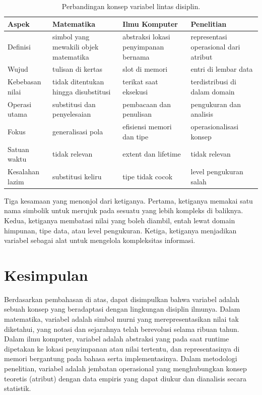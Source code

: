 \documentclass[11pt,a4paper]{article}
\begin{document}
\begin{table}[H]
	\centering
	\caption{Perbandingan konsep variabel lintas disiplin.}
	\label{tab:comparison}
	\footnotesize
	\begin{tabularx}{\textwidth}{l X X X}
		\toprule
		Aspek           & Matematika                            & Ilmu Komputer                        & Penelitian                            \\
		\midrule
		Definisi        & simbol yang mewakili objek matematika & abstraksi lokasi penyimpanan bernama & representasi operasional dari atribut \\
		Wujud           & tulisan di kertas                     & slot di memori                       & entri di lembar data                  \\
		Kebebasan nilai & tidak ditentukan hingga disubstitusi  & terikat saat eksekusi                & terdistribusi di dalam domain         \\
		Operasi utama   & substitusi dan penyelesaian           & pembacaan dan penulisan              & pengukuran dan analisis               \\
		Fokus           & generalisasi pola                     & efisiensi memori dan tipe            & operasionalisasi konsep               \\
		Satuan waktu    & tidak relevan                         & extent dan lifetime                  & tidak relevan                         \\
		Kesalahan lazim & substitusi keliru                     & tipe tidak cocok                     & level pengukuran salah                \\
		\bottomrule
	\end{tabularx}
\end{table}

Tiga kesamaan yang menonjol dari ketiganya. Pertama, ketiganya memakai satu nama simbolik untuk merujuk pada sesuatu yang lebih kompleks di baliknya. Kedua, ketiganya membatasi nilai yang boleh diambil, entah lewat domain himpunan, tipe data, atau level pengukuran. Ketiga, ketiganya menjadikan variabel sebagai alat untuk mengelola kompleksitas informasi.

\section{Kesimpulan}

Berdasarkan pembahasan di atas, dapat disimpulkan bahwa variabel adalah sebuah konsep yang beradaptasi dengan lingkungan disiplin ilmunya. Dalam matematika, variabel adalah simbol murni yang merepresentasikan nilai tak diketahui, yang notasi dan sejarahnya telah berevolusi selama ribuan tahun. Dalam ilmu komputer, variabel adalah abstraksi yang pada saat runtime dipetakan ke lokasi penyimpanan atau nilai tertentu, dan representasinya di memori bergantung pada bahasa serta implementasinya. Dalam metodologi penelitian, variabel adalah jembatan operasional yang menghubungkan konsep teoretis (atribut) dengan data empiris yang dapat diukur dan dianalisis secara statistik.
\end{document}
